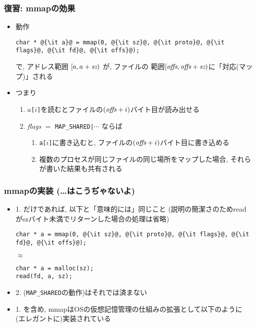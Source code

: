 \documentclass[12pt,dvipdfmx]{beamer}
\begin{document}
\begin{frame}[fragile]
  \frametitle{復習: mmapの効果}
  \begin{itemize}
  \item 動作
\begin{lstlisting}
char * @{\it a}@ = mmap(0, @{\it sz}@, @{\it proto}@, @{\it flags}@, @{\it fd}@, @{\it offs}@);
\end{lstlisting}
で, アドレス範囲 $[a, a+\mbox{\it sz})$ が, ファイルの
範囲$[\mbox{\it offs}, \mbox{\it offs} + \mbox{\it sz})$に「対応(マップ)」される
\item つまり
  \begin{enumerate}
  \item {\tt $a$[$i$]}を読むとファイルの$(\mbox{\it offs} + i)$バイト目が読み出せる
  \item {\it flags} $=$ {\tt MAP\_SHARED|$\cdots$} ならば
    \begin{enumerate}
    \item {\tt a[$i$]}に書き込むと,
      ファイルの$(\mbox{\it offs} + i)$バイト目に書き込める
    \item 複数のプロセスが同じファイルの同じ場所をマップした場合,
      それらが書いた結果も共有される
    \end{enumerate}
  \end{enumerate}
  \end{itemize}
\end{frame}

\begin{frame}[fragile]
  \frametitle{mmapの実装 (\ldots はこうぢゃないよ)}
  \begin{itemize}
  \item 1. だけであれば, 以下と「意味的には」同じこと
    (説明の簡潔さのためreadがszバイト未満でリターンした場合の処理は省略)
\begin{lstlisting}
char * a = mmap(0, @{\it sz}@, @{\it proto}@, @{\it flags}@, @{\it fd}@, @{\it offs}@);
\end{lstlisting}
$\approx$
\begin{lstlisting}
char * a = malloc(sz);
read(fd, a, sz);
\end{lstlisting}
\item 2. ({\tt MAP\_SHARED}の動作)はそれでは済まない
\item 1. を含め, mmapはOSの仮想記憶管理の仕組みの拡張として以下のように
  (エレガントに)実装されている
\end{itemize}
\end{frame}
\end{document}
